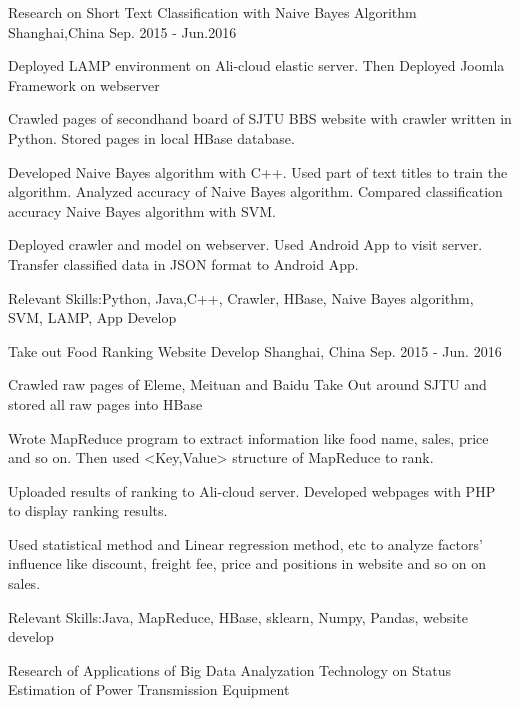 \begin{cventries}
  \cventry
    {}
    {Research on Short Text Classification with Naive Bayes Algorithm}
    {Shanghai,China}
    {Sep. 2015 - Jun.2016}
    {
      \begin{cvitems}
      \vspace{-10pt}
        \item {Deployed LAMP environment on Ali-cloud elastic server. Then Deployed Joomla Framework on webserver}
        \item {Crawled pages of secondhand board of SJTU BBS website with crawler written in Python. Stored pages in local HBase database.}
        \item{Developed Naive Bayes algorithm with C++. Used part of text titles to train the algorithm. Analyzed accuracy of Naive Bayes algorithm. Compared classification accuracy Naive Bayes algorithm with SVM.}
        \item{Deployed crawler and model on webserver. Used Android App to visit server. Transfer classified data in JSON format to Android App.}
        \item{Relevant Skills:Python, Java,C++, Crawler, HBase, Naive Bayes algorithm, SVM, LAMP, App Develop}
      \end{cvitems}
      }
  \cventry
    {}
    {Take out Food Ranking Website Develop}
    {Shanghai, China}
    {Sep. 2015 - Jun. 2016}
    {
      \begin{cvitems}
      \vspace{-10pt}
        \item {Crawled raw pages of Eleme, Meituan and Baidu Take Out around SJTU and stored all raw pages into HBase}
        \item {Wrote MapReduce program to extract information like food name, sales, price and so on. Then used  <Key,Value> structure of MapReduce to rank.}
        \item {Uploaded results of ranking to Ali-cloud server. Developed webpages with PHP to display ranking results.}
        \item {Used statistical method and Linear regression method, etc to analyze factors' influence like discount, freight fee, price and positions in website and so on on sales.}
        \item{Relevant Skills:Java, MapReduce, HBase, sklearn, Numpy, Pandas, website develop}
      \end{cvitems}
    }
    \cventry
    {}
    {Research of Applications of Big Data Analyzation Technology on Status Estimation of Power Transmission Equipment}

\end{cventries}
